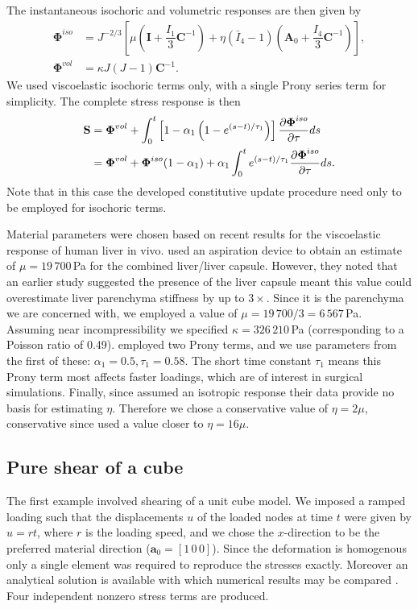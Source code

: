 The instantaneous isochoric and volumetric responses are then given by
\begin{align}
\boldsymbol \Phi^{iso} &= J^{-2/3} \left[ \mu \left( \mathbf{I} + \dfrac{I_1}{3} \mathbf{C}^{-1} \right) + \eta (\bar{I}_4 - 1) \left( \mathbf{A}_0 + \dfrac{I_4}{3} \mathbf{C}^{-1} \right) \right], \\
\boldsymbol \Phi^{vol} &= \kappa J (J - 1) \mathbf{C}^{-1}.
\end{align}
We used viscoelastic isochoric terms only, with a single Prony series term for simplicity. The complete stress response is then
\begin{align}
\mathbf{S} &= \boldsymbol \Phi^{vol} + \int_0^t \left[ 1 - \alpha_1 \left(1-e^{(s-t)/\tau_1} \right) \right] \dfrac{\partial \boldsymbol \Phi^{iso}}{\partial \tau} ds \notag \\
&= \boldsymbol \Phi^{vol} + \boldsymbol \Phi^{iso}(1 - \alpha_1) + \alpha_1 \int_0^t e^{(s-t)/\tau_1} \dfrac{\partial \boldsymbol \Phi^{iso}}{\partial \tau} ds.
\end{align}
Note that in this case the developed constitutive update procedure need only to be employed for isochoric terms. 

\bigskip

Material parameters were chosen based on recent results for the viscoelastic response of human liver in vivo. \cite{Nava08} used an aspiration device to obtain an estimate of $\mu = 19\,700\,$Pa for the combined liver/liver capsule. However, they noted that an earlier study suggested the presence of the liver capsule meant this value could overestimate liver parenchyma stiffness by up to $3 \times$. Since it is the parenchyma we are concerned with, we employed a value of $\mu = 19\,700/3 = 6\,567\,$Pa. Assuming near incompressibility we specified $\kappa = 326\,210\,$Pa (corresponding to a Poisson ratio of 0.49). \citeauthor{Nava08} employed two Prony terms, and we use parameters from the first of these: $\alpha_1 = 0.5, \tau_1 = 0.58$. The short time constant $ \tau_1 $ means this Prony term most affects faster loadings, which are of interest in surgical simulations. Finally, since \citeauthor{Nava08} assumed an isotropic response their data provide no basis for estimating $ \eta $. Therefore we chose a conservative value of $\eta = 2\mu$, conservative since \cite{Picinbono01} used a value closer to $\eta = 16\mu$. 


	\subsection{Pure shear of a cube}
The first example involved shearing of a unit cube model. We imposed a ramped loading such that the displacements $u$ of the loaded nodes at time $t$ were given by $u = rt$, where $r$ is the loading speed, and we chose the $x$-direction to be the preferred material direction ($\mathbf{a}_0 = [1\, 0\, 0 ]$). Since the deformation is homogenous only a single element was required to reproduce the stresses exactly. Moreover an analytical solution is available with which numerical results may be compared \citep{Taylor2009}. Four independent nonzero stress terms are produced. 
	
